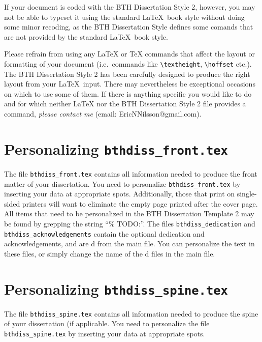 If your document is coded with the BTH Dissertation Style 2, however, you may not be able to typeset it using the standard \LaTeX\ book style
without doing some minor recoding, as the BTH Dissertation Style defines some comands that are not provided by the standard \LaTeX\ book style.

Please refrain from using any \LaTeX{} or \TeX{} commands that affect the layout or formatting of your document (i.e.\ commands like \verb|\textheight|, \verb|\hoffset| etc.).
The BTH Dissertation Style 2 has been carefully designed to produce the right layout from your \LaTeX\ input.
There may nevertheless be exceptional occasions on which to use some of them.
If there is anything specific you would like to do and for which neither \LaTeX{} nor the BTH Dissertation Style 2 file 
provides a command, {\em please contact me\/} (email: EricNNilsson@gmail.com).

\section{Personalizing {\tt bthdiss\_front.tex}}
The file {\tt bthdiss\_front.tex} contains all information needed to produce the front matter of your dissertation.
You need to personalize {\tt bthdiss\_front.tex} by inserting your data at appropriate spots.
Additionally, those that print on single-sided printers will want to eliminate the empty page printed after the cover page.
All items that need to be personalized in the BTH Dissertation Template 2 may be found by grepping the string ``{\% TODO:}''.
The files {\tt bthdiss\_dedication} and {\tt bthdiss\_acknowledgements} contain the optional dedication and acknowledgements, and are \verb||d
from the main file.
You can personalize the text in these files, or simply change the name of the \verb||d files in the main file.

\section{Personalizing {\tt bthdiss\_spine.tex}}
The file {\tt bthdiss\_spine.tex} contains all information needed to produce the spine of your dissertation (if applicable.
You need to personalize the file {\tt bthdiss\_spine.tex} by inserting your data at appropriate spots.
